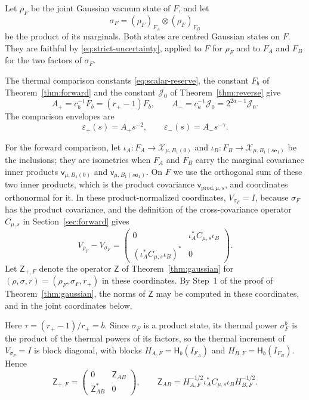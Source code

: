 \documentclass[11pt]{amsart}
\numberwithin{equation}{section}
\theoremstyle{definition}
\newcommand{\vv}{\mathsf v}
\newcommand{\Therm}{\mathsf H}
\newcommand{\eone}{\mathbf e_1}
\begin{document}
Let \(\rho_F\) be the joint Gaussian vacuum state of \(F\), and let
\[
 \sigma_F=(\rho_F)_{F_A}\otimes(\rho_F)_{F_B}
\]
be the product of its marginals. Both states are centred Gaussian
states on \(F\). They are faithful by \eqref{eq:strict-uncertainty},
applied to \(F\) for \(\rho_F\) and to \(F_A\) and \(F_B\) for the two
factors of \(\sigma_F\).

The thermal comparison constants \eqref{eq:scalar-reserve}, the
constant \(F_b\) of Theorem~\ref{thm:forward} and the constant
\(\mathcal J_0\) of Theorem~\ref{thm:reverse} give
\begin{equation}
 A_+=c_b^{-1}F_b=(r_+-1)F_b,\qquad
 A_-=c_a^{-1}\mathcal J_0=2^{2a-1}\mathcal J_0.
 \label{eq:Aconstants}
\end{equation}
The comparison envelopes are
\begin{equation}
 \varepsilon_+(s)=A_+s^{-2},\qquad
 \varepsilon_-(s)=A_-s^{-\gamma}.
 \label{eq:envelopes}
\end{equation}

For the forward comparison, let
\(\iota_A\colon F_A\to\mathcal X_{\mu,B_1(0)}\) and
\(\iota_B\colon F_B\to\mathcal X_{\mu,B_1(s\eone)}\) be the inclusions;
they are isometries when \(F_A\) and \(F_B\) carry the marginal
covariance inner products \(\vv_{\mu,B_1(0)}\) and
\(\vv_{\mu,B_1(s\eone)}\). On \(F\) we use the orthogonal sum of these
two inner products, which is the product covariance
\(\vv_{\mathrm{prod},\mu,s}\), and coordinates orthonormal for it. In
these product-normalized coordinates, \(V_{\sigma_F}=I\), because
\(\sigma_F\) has the product covariance, and the definition of the
cross-covariance operator \(C_{\mu,s}\) in Section~\ref{sec:forward}
gives
\[
 V_{\rho_F}-V_{\sigma_F}
 =\begin{pmatrix}
  0&\iota_A^*C_{\mu,s}\iota_B\\
  (\iota_A^*C_{\mu,s}\iota_B)^*&0
 \end{pmatrix}.
\]
Let \(\mathsf Z_{+,F}\)
denote the operator \(\mathsf Z\) of Theorem~\ref{thm:gaussian} for
\((\rho,\sigma,r)=(\rho_F,\sigma_F,r_+)\) in these coordinates.
By Step~1 of the proof of Theorem~\ref{thm:gaussian}, the norms of
\(\mathsf Z\) may be computed in these coordinates, and in the joint
coordinates below.

Here \(\tau=(r_+-1)/r_+=b\). Since \(\sigma_F\) is a product state, its
thermal power \(\sigma_F^b\) is the product of the thermal powers of its
factors, so the thermal increment of \(V_{\sigma_F}=I\) is block
diagonal, with blocks \(H_{A,F}=\Therm_b(I_{F_A})\) and
\(H_{B,F}=\Therm_b(I_{F_B})\). Hence
\[
 \mathsf Z_{+,F}
 =\begin{pmatrix}0&\mathsf Z_{AB}\\ \mathsf Z_{AB}^*&0\end{pmatrix},
 \qquad
 \mathsf Z_{AB}=H_{A,F}^{-1/2}\iota_A^*C_{\mu,s}\iota_BH_{B,F}^{-1/2}.
\]
\end{document}
